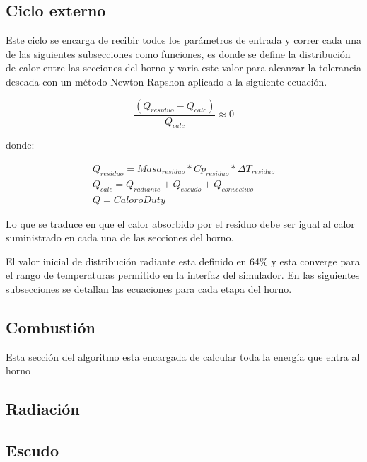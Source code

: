 \subsection{Ciclo externo}

\par Este ciclo se encarga de recibir todos los parámetros de entrada y correr cada una de las siguientes subsecciones como funciones, es donde se define la distribución de calor entre las secciones del horno y varia este valor para alcanzar la tolerancia deseada con un método Newton Rapshon aplicado a la siguiente ecuación.

\begin{equation}
\label{eq:ciclo_externo}
\frac{(Q_{residuo} - Q_{calc})}{Q_{calc}} \approx 0
\end{equation}

donde:

\begin{gather*}
Q_{residuo} = Masa_{residuo} * Cp_{residuo} * {\Delta}T_{residuo} \\
Q_{calc} = Q_{radiante} + Q_{escudo} + Q_{convectivo} \\
Q = Calor o Duty
\end{gather*}

\par Lo que se traduce en que el calor absorbido por el residuo debe ser igual al calor suministrado en cada una de las secciones del horno.

\par El valor inicial de distribución radiante esta definido en 64\% y esta converge para el rango de temperaturas permitido en la interfaz del simulador. En las siguientes subsecciones se detallan las ecuaciones para cada etapa del horno.

\subsection{Combustión}

\par Esta sección del algoritmo esta encargada de calcular toda la energía que entra al horno

\subsection{Radiación}

\par 

\subsection{Escudo}

